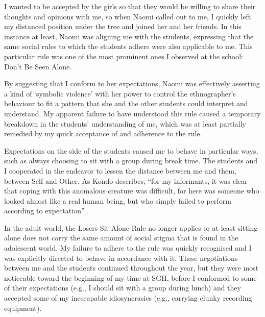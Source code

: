 I wanted to be accepted by the girls so that they would be willing to share their thoughts and opinions with me, so when Naomi called out to me, I quickly left my distanced position under the tree and joined her and her friends. In this instance at least, Naomi was aligning me with the students, expressing that the same social rules to which the students adhere were also applicable to me. This particular rule was one of the most prominent ones I observed at the school: Don't Be Seen Alone. 

By suggesting that I conform to her expectations, Naomi was effectively asserting a kind of `symbolic violence' \citep[130]{rabinow1977} with her power to control the ethnographer's behaviour to fit a pattern that she and the other students could interpret and understand. My apparent failure to have understood this rule caused a temporary breakdown in the students' understanding of me, which was at least partially remedied by my quick acceptance of and adherence to the rule.
\nocite{rabinow1977} 

Expectations on the side of the students caused me to behave in particular ways, such as always choosing to sit with a group during break time. The students and I cooperated in the endeavor to lessen the distance between me and them, between Self and Other. As Kondo describes,	``for my informants, it was clear that coping with this anomalous creature was difficult, for here was someone who looked almost like a real human being, but who simply failed to perform according to expectation'' \citep[76]{kondo1986}.

In the adult world, the Losers Sit Alone Rule no longer applies or at least sitting alone does not carry the same amount of social stigma that is found in the adolescent world. My failure to adhere to the rule was quickly recognised and I was explicitly directed to behave in accordance with it. These negotiations between me and the students continued throughout the year, but they were most noticeable toward the beginning of my time at SGH, before I conformed to some of their expectations (e.g., I should sit with a group during lunch) and they accepted some of my inescapable idiosyncrasies (e.g., carrying clunky recording equipment).
\nocite{kondo1986}


